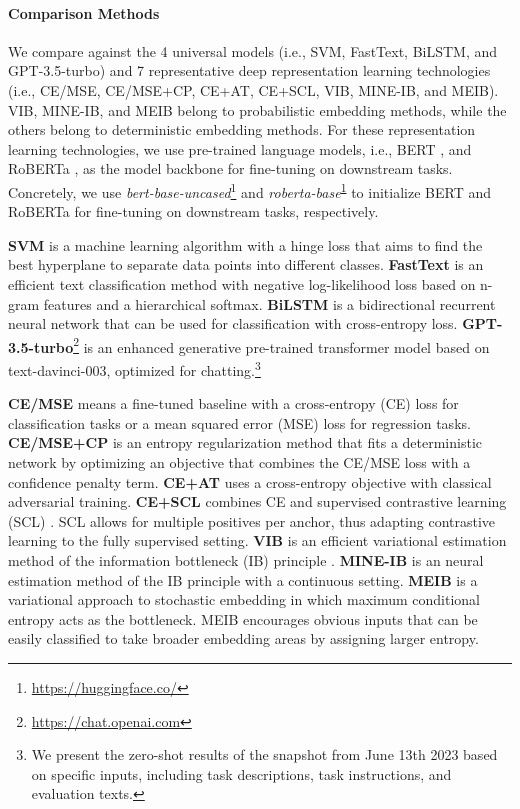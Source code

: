\documentclass[letterpaper]{article} %
\begin{document}
\paragraph{Comparison Methods}
We compare against the 4 universal models (i.e., SVM, FastText, BiLSTM, and GPT-3.5-turbo) and 7 representative deep representation learning technologies (i.e.,
CE/MSE, CE/MSE+CP, CE+AT, CE+SCL, VIB, MINE-IB, and MEIB).
VIB, MINE-IB, and MEIB belong to probabilistic embedding methods, while the others belong to deterministic embedding methods.
For these representation learning technologies, we use pre-trained language models, i.e., BERT \cite{DBLP:conf/naacl/DevlinCLT19}, and RoBERTa \cite{DBLP:journals/corr/abs-1907-11692}, as the model backbone for fine-tuning on downstream tasks.
Concretely, we use \textit{bert-base-uncased}\footnote{\url{https://huggingface.co/}\label{code}} and \textit{roberta-base}\textsuperscript{\ref{code}} to initialize BERT and RoBERTa for fine-tuning on downstream tasks, respectively.


\textbf{SVM} \cite{cortes1995support} is a machine learning algorithm with a hinge loss that aims to find the best hyperplane to separate data points into different classes.
\textbf{FastText} \cite{joulin2017bag} is an efficient text classification method with negative log-likelihood loss based on n-gram features and a hierarchical softmax.
\textbf{BiLSTM} is a bidirectional recurrent neural network \cite{hochreiter1997long} that can be used for classification with cross-entropy loss.
\textbf{GPT-3.5-turbo}\footnote{\url{https://chat.openai.com}} is an enhanced generative pre-trained transformer model based on text-davinci-003, optimized for chatting.\footnote{We present the zero-shot results of the snapshot from June 13th 2023 based on specific inputs, including task descriptions, task instructions, and evaluation texts.}


\textbf{CE/MSE} means a fine-tuned baseline with a cross-entropy (CE) loss for classification tasks or a mean squared error (MSE) loss for regression tasks.
\textbf{CE/MSE+CP} \cite{DBLP:conf/iclr/PereyraTCKH17} is an entropy regularization method that fits a deterministic network by optimizing an objective that combines the CE/MSE loss with a confidence penalty term.
\textbf{CE+AT} \citep{DBLP:conf/iclr/MiyatoDG17} uses a cross-entropy objective with classical adversarial training.
\textbf{CE+SCL} \cite{gunel2020supervised} combines CE and supervised contrastive learning (SCL) \cite{khosla2020supervised}.
SCL allows for multiple positives per anchor, thus adapting contrastive learning to the fully supervised setting.
\textbf{VIB} \cite{DBLP:conf/iclr/AlemiFD017,DBLP:conf/iclr/MahabadiBH21}  is an efficient variational estimation method of the information bottleneck (IB) principle \cite{tishby2015deep}.
\textbf{MINE-IB} \cite{DBLP:conf/icml/BelghaziBROBHC18}
is an neural estimation method of the IB principle with a continuous setting.
\textbf{MEIB}
\cite{DBLP:conf/cvpr/AnJC23} is a variational approach to stochastic embedding in which maximum conditional entropy acts as the bottleneck.
MEIB encourages obvious inputs that can be easily classified to take broader embedding areas by assigning larger entropy.
\end{document}

